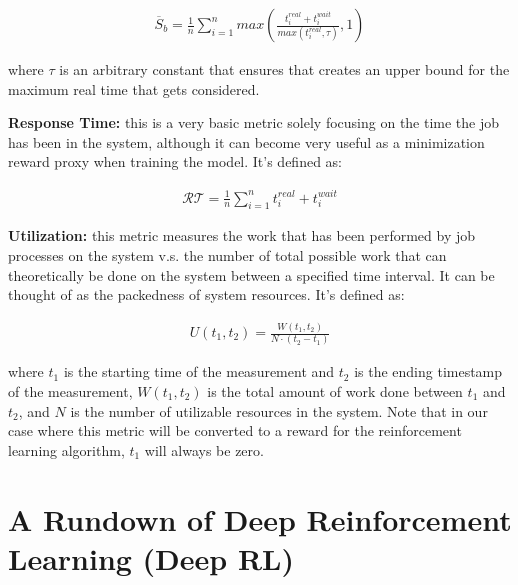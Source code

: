 \documentclass{article}
\begin{document}
\begin{spacing}{2.0}
\begin{gather*}
    \overline S_{b} = \frac{1}{n} \sum_{i = 1}^{n} max \left (\frac{t_{i}^{real} + t_{i}^{wait}}{max(t_{i}^{real}, \tau)}, 1 \right )
\end{gather*}

where $\tau$ is an arbitrary constant that ensures that creates an upper bound for the maximum real time that gets considered.

\textbf{Response Time:} this is a very basic metric solely focusing on the time the job has been in the system, although it can become very useful as a minimization reward proxy when training the model. It's defined as:

\begin{gather*}
    \mathcal{RT} = \frac{1}{n} \sum_{i = 1}^{n} t^{real}_{i} + t^{wait}_{i}
\end{gather*}

\textbf{Utilization:} this metric measures the work that has been performed by job processes on the system v.s. the number of total possible work that can theoretically be done on the system between a specified time interval. It can be thought of as the packedness of system resources. It's defined as:

\begin{gather*}
    U(t_{1}, t_{2}) = \frac{W(t_{1}, t_{2})}{N \cdot (t_{2} - t_{1})}
\end{gather*}

where $t_{1}$ is the starting time of the measurement and $t_{2}$ is the ending timestamp of the measurement, $W(t_{1}, t_{2})$ is the total amount of work done between $t_{1}$ and $t_{2}$, and $N$ is the number of utilizable resources in the system. Note that in our case where this metric will be converted to a reward for the reinforcement learning algorithm, $t_{1}$ will always be zero.

\newpage
\section{A Rundown of Deep Reinforcement Learning (Deep RL)}


\end{spacing}
\end{document}

